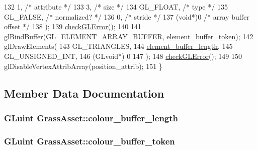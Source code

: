\begin{DoxyCode}
132     1,        \textcolor{comment}{/* attribute */}
133     3,        \textcolor{comment}{/* size */}
134     GL\_FLOAT,   \textcolor{comment}{/* type */}
135     GL\_FALSE,   \textcolor{comment}{/* normalized? */}
136     0,        \textcolor{comment}{/* stride */}
137     (\textcolor{keywordtype}{void}*)0    \textcolor{comment}{/* array buffer offset */}
138   );
139   \hyperlink{GrassAsset_8cc_a75f201b0e53e68726854997957322b8d}{checkGLError}();
140 
141   glBindBuffer(GL\_ELEMENT\_ARRAY\_BUFFER, \hyperlink{classGrassAsset_accd7a1c61ad5a5c29f9e8abf653e86a8}{element\_buffer\_token});
142   glDrawElements(
143     GL\_TRIANGLES,
144     \hyperlink{classGrassAsset_a3bb3e3d9ac2d7806f0c8d2c04559e4c9}{element\_buffer\_length},
145     GL\_UNSIGNED\_INT,
146     (GLvoid*) 0
147   );
148   \hyperlink{GrassAsset_8cc_a75f201b0e53e68726854997957322b8d}{checkGLError}();
149 
150   glDisableVertexAttribArray(position\_attrib);
151 \}
\end{DoxyCode}


\subsection{Member Data Documentation}
\hypertarget{classGrassAsset_aede615b26df4a5624f262a10bc000d92}{}
\subsubsection[{colour\+\_\+buffer\+\_\+length}]{\setlength{\rightskip}{0pt plus 5cm}G\+Luint Grass\+Asset\+::colour\+\_\+buffer\+\_\+length\hspace{0.3cm}{\ttfamily [private]}}\label{classGrassAsset_aede615b26df4a5624f262a10bc000d92}
\hypertarget{classGrassAsset_a96a3d9c956d29cd63308c7a97f6ac3bf}{}
\subsubsection[{colour\+\_\+buffer\+\_\+token}]{\setlength{\rightskip}{0pt plus 5cm}G\+Luint Grass\+Asset\+::colour\+\_\+buffer\+\_\+token\hspace{0.3cm}{\ttfamily [private]}}\label{classGrassAsset_a96a3d9c956d29cd63308c7a97f6ac3bf}
\hypertarget{classGrassAsset_a3bb3e3d9ac2d7806f0c8d2c04559e4c9}{}
